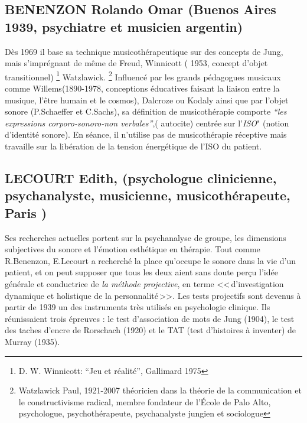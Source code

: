           

         

  \subsection{BENENZON Rolando Omar (Buenos Aires 1939, psychiatre et
    musicien argentin)} 
	  
	  \label{benenzon}
	  Dès 1969 il base sa technique 
	  musicothérapeutique sur des concepts 
	  de Jung, mais s'imprégnant de même de Freud, Winnicott (
          1953, concept d'objet transitionnel) \footnote{
          D. W. Winnicott: ``Jeu et réalité'', Gallimard 1975 }
          Watzlawick. \footnote{ Watzlawick Paul, 1921-2007  théoricien dans la théorie de la communication et le constructivisme radical, membre fondateur de l'École de Palo Alto, psychologue, psychothérapeute, psychanalyste jungien et sociologue} 
	  Influencé par les grands  pédagogues musicaux comme
          Willems(1890-1978, conceptions éducatives faisant la liaison
          entre la musique, l'être humain et le cosmos),
          Dalcroze ou Kodaly ainsi que par l'objet sonore (P.Schaeffer
          et C.Sachs), sa définition de musicothérapie comporte  
	  \emph{\textsl{ ``les expressions corporo-sonoro-non verbales''}},( autocite)
	  centrée sur l'\textit{ISO}" (notion
          d'identité sonore). En séance, il n'utilise pas de
          musicothérapie réceptive mais travaille sur la libération de
          la tension énergétique de l'ISO du patient.

        \subsection{LECOURT Edith, (psychologue clinicienne,
          psychanalyste, musicienne, musicothérapeute, Paris )}
      Ses recherches
        actuelles portent sur la psychanalyse de groupe, les
        dimensions subjectives du sonore  et l'émotion esthétique en thérapie.
   Tout comme R.Benenzon, E.Lecourt a recherché  la place qu'occupe le sonore dans la vie d'un 
        patient, et on peut supposer que tous les deux aient sans doute perçu l'idée générale et 
        conductrice de \emph{la méthode projective}, 
        en terme 
	    <<\,d'investigation dynamique et holistique de la
            personnalité\,>>.
            Les tests projectifs sont devenus à partir
        de 1939 un des instruments très utilisés en psychologie
        clinique. Ils réunissaient trois épreuves : le test
        d'association de mots de Jung (1904), le test des taches
        d'encre de Rorschach (1920) et le TAT (test d'histoires à
        inventer) de Murray (1935)\autocite[ch.~1, p.~13]{anzieu.chabert:methodes}.

